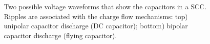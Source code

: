 \begin{figure}[!h]
\centering
    \begin{subfigure}{\textwidth}
        \parbox[c]{.03\linewidth}{\subcaption{}}
        \hspace{.02\linewidth}
        \parbox[c]{.95\linewidth}{
        \centering
        }
        \label{fig:exp_rscc_dc_node_100kHz}
    \end{subfigure}

%
%

\caption{Two possible voltage waveforms that show the capacitors in a SCC. Ripples are associated with the charge flow mechanisms: top) unipolar capacitor discharge (DC capacitor); bottom) bipolar capacitor discharge (flying capacitor).}
\label{fig:exp_rscc_pwm_node}
\end{figure}


